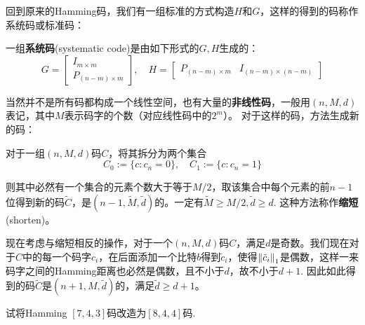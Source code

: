 回到原来的Hamming码，我们有一组标准的方式构造$H$和$G$，这样的得到的码称作系统码或标准码：
\begin{definition}[系统码]
    一组\textbf{系统码}(systematic code)是由如下形式的$G,H$生成的：
    \[
G = \left[\begin{array}{c}
I_{m \times m} \\ \hline 
P_{(n-m)\times m}
\end{array}\right] ,\quad 
H = \left[\begin{array}{c|c}
P_{(n-m)\times m} & I_{(n-m)\times (n-m)}
\end{array}\right]
    \]
\end{definition}

当然并不是所有码都构成一个线性空间，也有大量的\textbf{非线性码}，一般用$(n,M,d)$表记，其中$M$表示码字的个数（对应线性码中的$2^m$）。 对于这样的码，方法生成新的码：
\begin{definition}[缩短]
    对于一组$(n,M,d)$码$C$，将其拆分为两个集合
    \[
    C_0 := \{c : c_n = 0\}, \quad C_1 := \{c : c_n = 1\}
    \]

    则其中必然有一个集合的元素个数大于等于$M/2$，取该集合中每个元素的前$n-1$位得到新的码$\tilde{C}$，是$(n-1,\tilde{M}, \tilde{d})$的。一定有$\tilde{M} \ge M/2, \tilde{d}\ge d$. 这种方法称作\textbf{缩短}(shorten)。
\end{definition}

现在考虑与缩短相反的操作，对于一个$(n,M,d)$码$C$，满足$d$是奇数。我们现在对于$C$中的每一个码字$c_i$，在后面添加一个比特$b$得到$\tilde{c}_i$，使得$\left\lVert\tilde{c}_i\right\rVert_1$是偶数，这样一来码字之间的Hamming距离也必然是偶数，且不小于$d$，故不小于$d+1$. 因此如此得到的码$\tilde{C}$是$(n+1,M,\tilde{d})$的，满足$\tilde{d} \ge d+1$。

\begin{example}
    试将Hamming $[7,4,3]$码改造为$[8,4,4]$码.
\end{example}